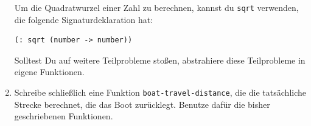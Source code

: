 \begin{aufgabe}
\begin{enumerate}
    Um die Quadratwurzel einer Zahl zu berechnen,
    kannst du \lstinline{sqrt} verwenden, die folgende
    Signaturdeklaration hat:
\begin{lstlisting}
(: sqrt (number -> number))
\end{lstlisting}
    Solltest Du auf weitere Teilprobleme stoßen, abstrahiere diese
    Teilprobleme in eigene Funktionen.

  \item Schreibe schließlich eine Funktion
    \lstinline{boat-travel-distance}, die die tatsächliche Strecke
    berechnet, die das Boot zurücklegt.  Benutze dafür die bisher
    geschriebenen Funktionen.
  \end{enumerate}
\end{aufgabe}




